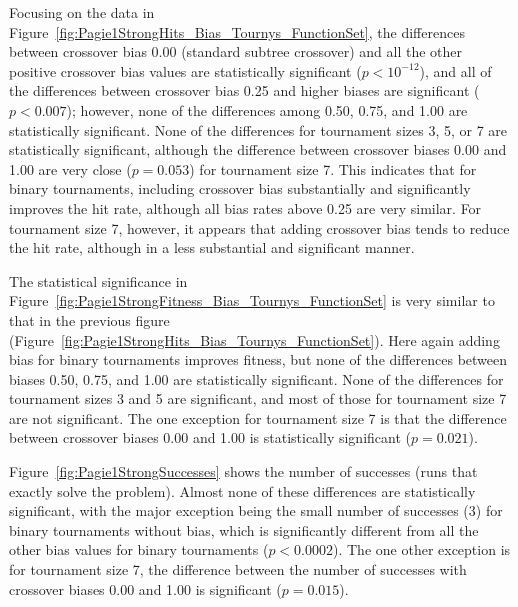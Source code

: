 \documentclass{sig-alternate}
\begin{document}
Focusing on the data in Figure~\ref{fig:Pagie1StrongHits_Bias_Tournys_FunctionSet}, the differences between crossover
bias 0.00 (standard subtree crossover) and all the other positive crossover bias values are statistically significant
($p<10^{-12}$), and all of the differences between crossover bias 0.25 and higher biases are significant ($p<0.007$);
however, none of the differences among 0.50, 0.75, and 1.00 are statistically significant. None of the differences for
tournament sizes 3, 5, or 7 are statistically significant, although the difference between crossover biases 0.00 and
1.00 are very close ($p=0.053$) for tournament size 7. This indicates that for binary tournaments, including crossover
bias substantially and significantly improves the hit rate, although all bias rates above 0.25 are very similar. For
tournament size 7, however, it appears that adding crossover bias tends to reduce the hit rate, although in a less
substantial and significant manner.

%
%
%
%

The statistical significance in Figure~\ref{fig:Pagie1StrongFitness_Bias_Tournys_FunctionSet} is very similar to that
in the previous figure (Figure~\ref{fig:Pagie1StrongHits_Bias_Tournys_FunctionSet}). Here again adding bias for binary
tournaments improves fitness, but none of the differences between biases 0.50, 0.75, and 1.00 are statistically
significant. None of the differences for tournament sizes 3 and 5 are significant, and most of those for tournament
size 7 are not significant. The one exception for tournament size 7 is that the difference between crossover biases
0.00 and 1.00 is statistically significant ($p = 0.021$).

Figure~\ref{fig:Pagie1StrongSuccesses} shows the number of successes (runs that exactly solve the problem). Almost none
of these differences are statistically significant, with the major exception being the small number of successes (3)
for binary tournaments without bias, which is significantly different from all the other bias values for binary
tournaments ($p<0.0002$). The one other exception is for tournament size 7, the difference between the number of
successes with crossover biases 0.00 and 1.00 is significant ($p=0.015$).
\end{document}
